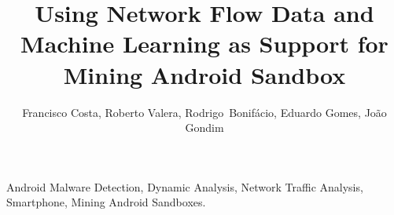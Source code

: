 \documentclass[10pt,journal,compsoc]{IEEEtran}
\begin{document}
\title{Using Network Flow Data and Machine Learning as Support for Mining Android Sandbox}


\author{Francisco Costa,
        Roberto Valera, 
        Rodrigo~Bonif\'{a}cio,
        Eduardo Gomes, 
        Jo\~{a}o Gondim
}









\maketitle
\begin{IEEEkeywords}
Android Malware Detection, Dynamic Analysis, Network Traffic Analysis, Smartphone, Mining Android Sandboxes.
\end{IEEEkeywords}









\balance 



\end{document}
